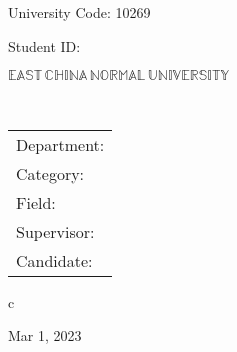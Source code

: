 \newpage

\pagestyle{empty}

\newline
\hspace*{\fill} {University Code: 10269}\\
\hspace*{\fill} {Student ID: 

}%

\vskip 2cm

\begin{center}
    {\Huge $\mathbb{EAST}\,\mathbb{CHINA}\,\mathbb{NORMAL}\,
            \mathbb{UNIVERSITY}$}
\end{center}

\vskip 3cm

\begin{center}
    \bfseries{\scshape{\huge \thesisETitle}}\\
\end{center}

\vskip 2cm {\large
        \begin{center}
            \begin{tabular}{l}
                Department:         \\
                Category:              \\
                Field: \\
                Supervisor:         \\
                Candidate:
            \end{tabular}
            \begin{tabular}c

    


                \hline
            \end{tabular}
        \end{center}}

\vskip 30mm

\begin{center}
    {\Large Mar 1, 2023}
\end{center}

